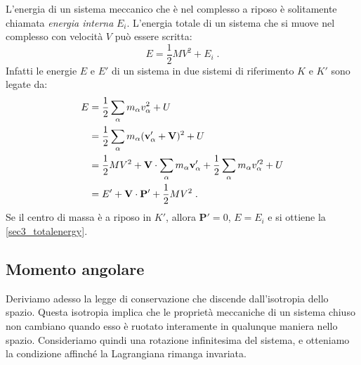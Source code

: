 L'energia di un sistema meccanico che è nel complesso a riposo è solitamente chiamata \textit{energia interna} $E_i$. L'energia totale di un sistema che si muove nel complesso con velocità $V$ può essere scritta:
\begin{equation}
E=\frac{1}{2}MV^2+E_i\;. \label{sec3_totalenergy}
\end{equation}
Infatti le energie $E$ e $E'$ di un sistema in due sistemi di riferimento $K$ e $K'$ sono legate da:
\begin{align}
E &= \frac{1}{2}\sum_{\alpha}m_{\alpha}v_{\alpha}^2+U \notag \\
&= \frac{1}{2}\sum_{\alpha}m_{\alpha}(\mathbf{v}_{\alpha}'+\mathbf{V})^2+U \notag \\
&= \frac{1}{2}MV^2+\mathbf{V}\cdot\sum_{\alpha} m_{\alpha}\mathbf{v}_{\alpha}'+\frac{1}{2}\sum_{\alpha} m_{\alpha}v_{\alpha}'^2+U \notag \\
&=E'+\mathbf{V}\cdot\mathbf{P}'+\frac{1}{2}MV^2\;.
\end{align}
Se il centro di massa è a riposo in $K'$, allora $\mathbf{P}'=0$, $E=E_i$ e si ottiene la \eqref{sec3_totalenergy}.
\subsection{Momento angolare}
Deriviamo adesso la legge di conservazione che discende dall'isotropia dello spazio. Questa isotropia implica che le proprietà meccaniche di un sistema chiuso non cambiano quando esso è ruotato interamente in qualunque maniera nello spazio. Consideriamo quindi una rotazione infinitesima del sistema, e otteniamo la condizione affinché la Lagrangiana rimanga invariata. \\


